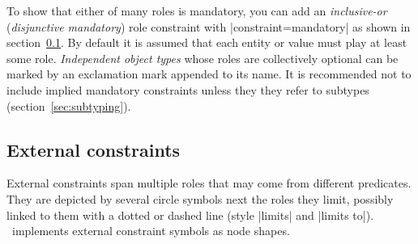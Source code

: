 \documentclass[a4paper,10pt]{article}
\begin{document}
\noindent To show that either of many roles is mandatory, you can add an \emph{inclusive-or} (\emph{disjunctive mandatory}) role constraint with |constraint=mandatory| as shown in section~\ref{sec:externalconstraints}. By default it is assumed that each entity or value must play at least some role. \emph{Independent object types} whose roles are collectively optional can be marked by an exclamation mark appended to its name. It is recommended not to include implied mandatory constraints unless they they refer to subtypes (section~\ref{sec:subtyping}).


\subsection{External constraints}
\label{sec:externalconstraints}
External constraints span multiple roles that may come from different predicates. They are depicted by several circle symbols next the roles they limit, possibly linked to them with a dotted or dashed line (style |limits| and |limits to|). \tkzorm\ implements external constraint symbols as node shapes.
\end{document}
